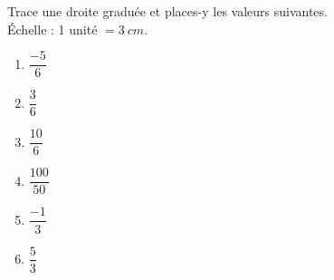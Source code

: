 \documentclass[../math2.tex]{subfiles}
\begin{document}
\begin{exercise}
  Trace une droite graduée et places-y les valeurs suivantes.\\
  Échelle : 1 unité $=\SI{3}{cm}$.
  \begin{enumerate}[cols=3]
    \item  $\dfrac{- 5}{6}$
    \item  $\dfrac{3}{6}$
    \item  $\dfrac{10}{6}$
    \item  $\dfrac{100}{50}$
    \item  $\dfrac{- 1}{3}$
    \item  $\dfrac{5}{3}$
  \end{enumerate}
\end{exercise}
\end{document}

